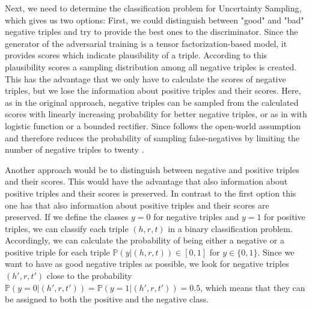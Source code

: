 Next, we need to determine the classification problem for Uncertainty Sampling, which gives us two options:
First, we could distinguish between "good" and "bad" negative triples and try to provide the best ones to the discriminator.
Since the generator of the adversarial training is a tensor factorization-based model, it provides scores which indicate plausibility of a triple.
According to this plausibility scores a sampling distribution among all negative triples is created. 
This has the advantage that we only have to calculate the scores of negative triples, but we lose the information about positive triples and their scores.
Here, as in the original \kbgan approach, negative triples can be sampled from the calculated scores with linearly increasing probability for better negative triples, or as in \cite{UKGE} with logistic function or a bounded rectifier. 
Since \kbgan follows the open-world assumption and therefore reduces the probability of sampling false-negatives by limiting the number of negative triples to twenty \cite{cai2017kbgan}.

Another approach would be to distinguish between negative and positive triples and their scores.
This would have the advantage that also information about positive triples and their scores is preserved.
In contrast to the first option this one has that also information about positive triples and their scores are preserved.
If we define the classes $y = 0$  for negative triples and $y = 1$ for positive triples, we can classify each triple $(h,r,t)$ in a binary classification problem.
Accordingly, we can calculate the probability of being either a negative or a positive triple for each triple $\mathbb{P}(y| (h,r,t)) \in [0,1]$ for $y \in \{0,1\}$.
Since we want to have as good negative triples as possible, we look for negative triples $(h',r,t')$ close to the probability $\mathbb{P}(y = 0| (h',r,t')) = \mathbb{P}(y = 1| (h',r,t')) = 0.5$, which means that they can be assigned to both the positive and the negative class.

